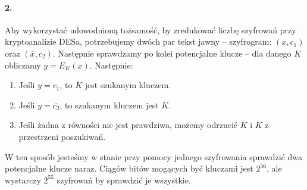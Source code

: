 \documentclass{article}
\renewcommand{\c}{\overline}
\begin{document}
\paragraph{2.}
Aby wykorzystać udowodnioną tożsamość,
by zredukować liczbę szyfrowań przy kryptoanalizie DESa,
potrzebujemy dwóch par tekst jawny -- szyfrogram:
$(x, c_1)$ oraz $(\c x, c_2)$.
Następnie sprawdzamy po kolei potencjalne klucze --
dla danego $K$ obliczamy $y = E_K(x)$.
Następnie:
\begin{enumerate}
    \item Jeśli $y = c_1$, to $K$ jest szukanym kluczem.
    \item Jeśli $y = \c{c_2}$, to szukanym kluczem jest $\c{K}$.
    \item Jeśli żadna z równości nie jest prawdziwa,
        możemy odrzucić $K$ i $\c K$ z przestrzeni poszukiwań.
\end{enumerate}
W ten sposób jesteśmy w stanie przy pomocy jednego szyfrowania
sprawdzić dwa potencjalne klucze naraz.
Ciągów bitów mogących być kluczami jest $2^{56}$,
ale wystarczy $2^{55}$ szyfrowań by sprawdzić je wszystkie.
\end{document}
